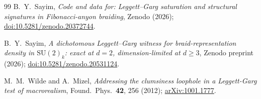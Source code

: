 \documentclass[aps,prx,reprint,amsmath,amssymb,floatfix,nofootinbib,superscriptaddress]{revtex4-2}
\begin{document}
\begin{thebibliography}{99}
B.~Y.~Sayim,
\emph{Code and data for: Leggett--Garg saturation and structural
signatures in Fibonacci-anyon braiding},
Zenodo (2026);
\href{https://doi.org/10.5281/zenodo.20372744}{doi:10.5281/zenodo.20372744}.

B.~Y.~Sayim,
\emph{A dichotomous Leggett--Garg witness for braid-representation
density in $\mathrm{SU}(2)_k$: exact at $d=2$, dimension-limited at
$d \ge 3$},
Zenodo preprint (2026);
\href{https://doi.org/10.5281/zenodo.20531124}{doi:10.5281/zenodo.20531124}.

M.~M.~Wilde and A.~Mizel,
\emph{Addressing the clumsiness loophole in a Leggett-Garg test of macrorealism},
Found.\ Phys.\ \textbf{42}, 256 (2012);
\href{https://arxiv.org/abs/1001.1777}{arXiv:1001.1777}.

\end{thebibliography}
\end{document}

